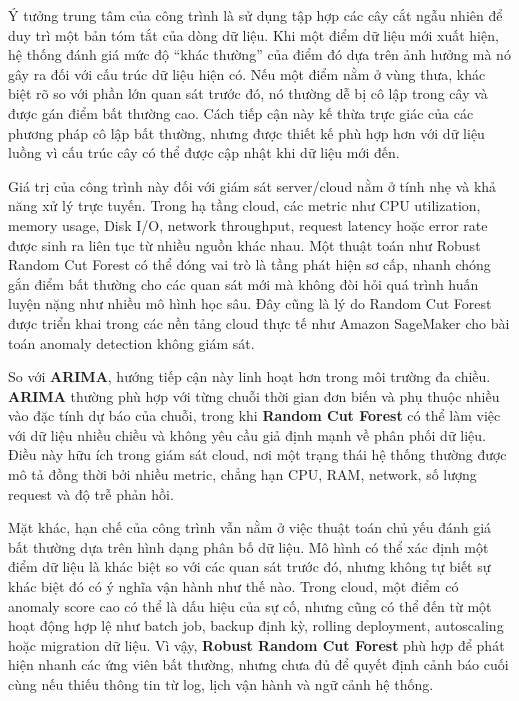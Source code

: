 Ý tưởng trung tâm của công trình là sử dụng tập hợp các cây cắt ngẫu nhiên để duy trì một bản tóm tắt của dòng dữ liệu. Khi một điểm dữ liệu mới xuất hiện, hệ thống đánh giá mức độ “khác thường” của điểm đó dựa trên ảnh hưởng mà nó gây ra đối với cấu trúc dữ liệu hiện có. Nếu một điểm nằm ở vùng thưa, khác biệt rõ so với phần lớn quan sát trước đó, nó thường dễ bị cô lập trong cây và được gán điểm bất thường cao. Cách tiếp cận này kế thừa trực giác của các phương pháp cô lập bất thường, nhưng được thiết kế phù hợp hơn với dữ liệu luồng vì cấu trúc cây có thể được cập nhật khi dữ liệu mới đến.

Giá trị của công trình này đối với giám sát server/cloud nằm ở tính nhẹ và khả năng xử lý trực tuyến. Trong hạ tầng cloud, các metric như CPU utilization, memory usage, Disk I/O, network throughput, request latency hoặc error rate được sinh ra liên tục từ nhiều nguồn khác nhau. Một thuật toán như Robust Random Cut Forest có thể đóng vai trò là tầng phát hiện sơ cấp, nhanh chóng gắn điểm bất thường cho các quan sát mới mà không đòi hỏi quá trình huấn luyện nặng như nhiều mô hình học sâu. Đây cũng là lý do Random Cut Forest được triển khai trong các nền tảng cloud thực tế như Amazon SageMaker cho bài toán anomaly detection không giám sát.

So với \textbf{ARIMA}, hướng tiếp cận này linh hoạt hơn trong môi trường đa chiều. \textbf{ARIMA} thường phù hợp với từng chuỗi thời gian đơn biến và phụ thuộc nhiều vào đặc tính dự báo của chuỗi, trong khi \textbf{Random Cut Forest} có thể làm việc với dữ liệu nhiều chiều và không yêu cầu giả định mạnh về phân phối dữ liệu. Điều này hữu ích trong giám sát cloud, nơi một trạng thái hệ thống thường được mô tả đồng thời bởi nhiều metric, chẳng hạn CPU, RAM, network, số lượng request và độ trễ phản hồi.

Mặt khác, hạn chế của công trình vẫn nằm ở việc thuật toán chủ yếu đánh giá bất thường dựa trên hình dạng phân bố dữ liệu. Mô hình có thể xác định một điểm dữ liệu là khác biệt so với các quan sát trước đó, nhưng không tự biết sự khác biệt đó có ý nghĩa vận hành như thế nào. Trong cloud, một điểm có anomaly score cao có thể là dấu hiệu của sự cố, nhưng cũng có thể đến từ một hoạt động hợp lệ như batch job, backup định kỳ, rolling deployment, autoscaling hoặc migration dữ liệu. Vì vậy, \textbf{Robust Random Cut Forest} phù hợp để phát hiện nhanh các ứng viên bất thường, nhưng chưa đủ để quyết định cảnh báo cuối cùng nếu thiếu thông tin từ log, lịch vận hành và ngữ cảnh hệ thống.

